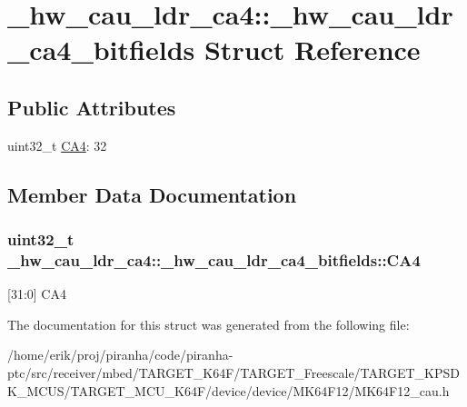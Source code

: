 \hypertarget{struct__hw__cau__ldr__ca4_1_1__hw__cau__ldr__ca4__bitfields}{}\section{\+\_\+hw\+\_\+cau\+\_\+ldr\+\_\+ca4\+:\+:\+\_\+hw\+\_\+cau\+\_\+ldr\+\_\+ca4\+\_\+bitfields Struct Reference}
\label{struct__hw__cau__ldr__ca4_1_1__hw__cau__ldr__ca4__bitfields}
\subsection*{Public Attributes}
\begin{DoxyCompactItemize}
\item 
uint32\+\_\+t \hyperlink{struct__hw__cau__ldr__ca4_1_1__hw__cau__ldr__ca4__bitfields_a2d141e58cb30777a0cad1fff2cb0d610}{C\+A4}\+: 32
\end{DoxyCompactItemize}


\subsection{Member Data Documentation}
\subsubsection[{\texorpdfstring{C\+A4}{CA4}}]{\setlength{\rightskip}{0pt plus 5cm}uint32\+\_\+t \+\_\+hw\+\_\+cau\+\_\+ldr\+\_\+ca4\+::\+\_\+hw\+\_\+cau\+\_\+ldr\+\_\+ca4\+\_\+bitfields\+::\+C\+A4}\hypertarget{struct__hw__cau__ldr__ca4_1_1__hw__cau__ldr__ca4__bitfields_a2d141e58cb30777a0cad1fff2cb0d610}{}\label{struct__hw__cau__ldr__ca4_1_1__hw__cau__ldr__ca4__bitfields_a2d141e58cb30777a0cad1fff2cb0d610}
\mbox{[}31\+:0\mbox{]} C\+A4 

The documentation for this struct was generated from the following file\+:\begin{DoxyCompactItemize}
\item 
/home/erik/proj/piranha/code/piranha-\/ptc/src/receiver/mbed/\+T\+A\+R\+G\+E\+T\+\_\+\+K64\+F/\+T\+A\+R\+G\+E\+T\+\_\+\+Freescale/\+T\+A\+R\+G\+E\+T\+\_\+\+K\+P\+S\+D\+K\+\_\+\+M\+C\+U\+S/\+T\+A\+R\+G\+E\+T\+\_\+\+M\+C\+U\+\_\+\+K64\+F/device/device/\+M\+K64\+F12/M\+K64\+F12\+\_\+cau.\+h\end{DoxyCompactItemize}
